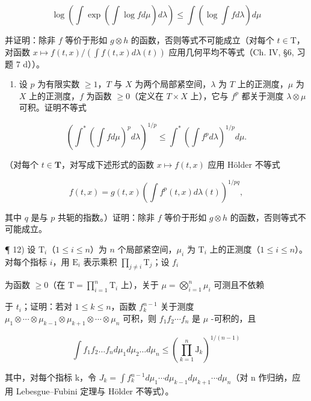\[
\log \left(\int \exp (\int \log f d \mu) d \lambda\right) \leqslant \int (\log \int f d \lambda) d \mu
\]

并证明：除非 \(f\) 等价于形如 \(g \otimes h\) 的函数，否则等式不可能成立（对每个 \(t \in \mathrm{T}\)，对函数 \(x \mapsto f(t,x) / (\int f(t,x)d\lambda (t))\) 应用几何平均不等式（Ch. IV, §6, 习题 7 d））。

\begin{enumerate}
\def\labelenumi{\arabic{enumi})}
\setcounter{enumi}{10}
\tightlist
\item
  设 \(p\) 为有限实数 \(\geqslant 1\)，\(T\) 与 \(X\) 为两个局部紧空间，\(\lambda\) 为 \(T\) 上的正测度，\(\mu\) 为 \(X\) 上的正测度，\(f\) 为函数 \(\geqslant 0\)（定义在 \(T \times X\) 上），它与 \(f^p\) 都关于测度 \(\lambda \otimes \mu\) 可积。证明不等式
\end{enumerate}

\[
\left(\int^ {*} \left(\int f d \mu\right) ^ {p} d \lambda\right) ^ {1 / p} \leqslant \int^ {*} \left(\int f ^ {p} d \lambda\right) ^ {1 / p} d \mu .
\]

（对每个 \(t \in \mathbf{T}\)，对写成下述形式的函数 \(x \mapsto f(t, x)\) 应用 Hölder 不等式

\[
f (t, x) = g (t, x) \left(\int f ^ {p} (t, x) d \lambda (t)\right) ^ {1 / p q},
\]

其中 \(q\) 是与 \(p\) 共轭的指数。）证明：除非 \(f\) 等价于形如 \(g \otimes h\) 的函数，否则等式不可能成立。

¶ 12) 设 \(\mathrm{T}_i\)（\(1 \leqslant i \leqslant n\)）为 \(n\) 个局部紧空间，\(\mu_i\) 为 \(\mathrm{T}_i\) 上的正测度（\(1 \leqslant i \leqslant n\)）。对每个指标 \(i\)，用 \(\mathrm{E}_i\) 表示乘积 \(\prod_{j \neq i} \mathrm{T}_j\)；设 \(f_i\)

为函数 \(\geqslant 0\)（在 \(\mathrm{T} = \prod_{i=1}^{n} \mathrm{T}_i\) 上），关于 \(\mu = \bigotimes_{i=1}^{n} \mu_i\) 可测且不依赖

于 \(t_{i}\)；证明：若对 \(1 \leqslant k \leqslant n\)，函数 \(f_{k}^{n-1}\) 关于测度 \(\mu_{1} \otimes \cdots \otimes \mu_{k-1} \otimes \mu_{k+1} \otimes \cdots \otimes \mu_{n}\) 可积，则 \(f_{1}f_{2} \cdots f_{n}\) 是 \(\mu\) -可积的，且

\[
\int f _ {1} f _ {2} \dots f _ {n} d \mu_ {1} d \mu_ {2} \dots d \mu_ {n} \leqslant \left(\prod_ {k = 1} ^ {n} \mathrm{J} _ {k}\right) ^ {1 / (n - 1)}
\]

其中，对每个指标 k，令 \(J_{k}=\int f_{k}^{n-1}d\mu_{1}\cdots d\mu_{k-1}d\mu_{k+1}\cdots d\mu_{n}\)（对 n 作归纳，应用 Lebesgue--Fubini 定理与 Hölder 不等式）。

